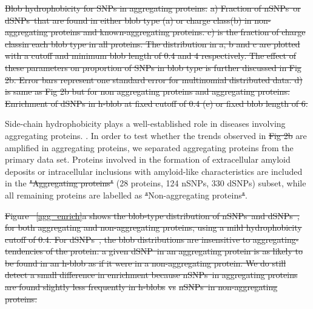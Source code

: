 \documentclass[9pt,twocolumn,twoside,lineno]{pnas-new} %
\newcommand{\dSNPs}{dSNPs~}
\newcommand{\nSNPs}{nSNPs~}
\newcommand{\dSNP}{dSNP~}
\newcommand{\chargechar}{charge class}
\providecommand{\DIFadd}[1]{{\protect\color{blue}\uwave{#1}}} %
\providecommand{\DIFdel}[1]{{\protect\color{red}\sout{#1}}}                      %
\providecommand{\DIFaddbegin}{} %
\providecommand{\DIFaddend}{} %
\providecommand{\DIFdelbegin}{} %
\providecommand{\DIFdelend}{} %
\providecommand{\DIFdelFL}[1]{\DIFdel{#1}} %
\begin{document}
{%
\DIFdelFL{Blob hydrophobicity for SNPs in aggregating proteins.}%
\DIFdelFL{a) Fraction of \nSNPs or \dSNPs that are found in either blob type (a) or \chargechar (b) in non-aggregating proteins and known-aggregating proteins. c) is the fraction of \chargechar in each blob type in all proteins. The distribution in a, b and c are plotted with a cutoff and minimum blob length of 0.4 and 4 respectively. The effect of these parameters on proportion of SNPs in blob type is further discussed in Fig 2b. Error bars represent one standard error for multinomial distributed data. d) is same as Fig 2b but for non aggregating proteins and aggregating proteins. Enrichment of dSNPs in h-blob at fixed cutoff of 0.4 (e) or fixed blob length of 6.
 }}

\DIFdelend Side-chain hydrophobicity plays a well-established role in diseases involving aggregating proteins. \citep{ConchilloSole2007, Fang2013, Tartaglia2008}. In order to test whether the trends observed in \DIFdelbegin \DIFdel{Fig 2b }\DIFdelend \DIFaddbegin \DIFadd{Figure \ref{blob_vs_window}D }\DIFaddend are amplified in aggregating proteins, we separated aggregating proteins from the primary data set. Proteins involved in the formation of extracellular amyloid deposits or intracellular inclusions with amyloid-like characteristics are included in the \DIFdelbegin \DIFdel{"Aggregating proteins" }\DIFdelend \DIFaddbegin \DIFadd{``Aggregating proteins'' }\DIFaddend (28 proteins, 124 nSNPs, 330 dSNPs) subset, while all remaining proteins are labelled as \DIFdelbegin \DIFdel{"}\DIFdelend \DIFaddbegin \DIFadd{``}\DIFaddend Non-aggregating proteins\DIFdelbegin \DIFdel{"}\DIFdelend \DIFaddbegin \DIFadd{''}\DIFaddend . 

\DIFdelbegin \DIFdel{Figure ~\ref{agg_enrich}a shows the blob-type distribution of \nSNPs and \dSNPs, for both aggregating and non-aggregating proteins, using a mild hydrophobicity cutoff of 0.4. For \dSNPs, the blob distributions are insensitive to aggregating-tendencies of the protein: a given \dSNP in an aggregating protein is as likely to be found in an h-blob as if it were in a non-aggregating protein. We do still detect a small difference in enrichment because \nSNPs in aggregating proteins are found slightly less frequently in h-blobs }%
\DIFdel{vs}%
\DIFdel{\nSNPs in non-aggregating proteins.   
}%
\end{document}
